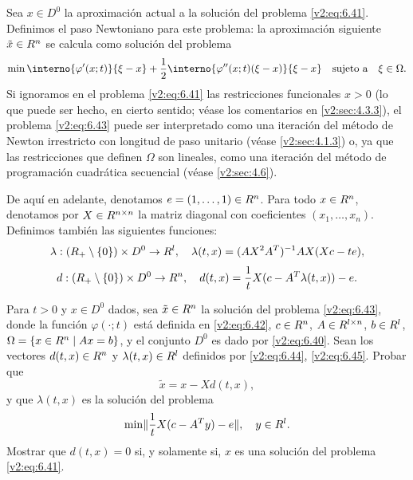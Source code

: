 Sea $x \in D^0$ la aproximación actual a la solución del problema \eqref{v2:eq:6.41}. Definimos el paso Newtoniano para este problema: la aproximación siguiente $\tilde{x} \in R^n$ se calcula como solución del problema
\begin{equation}
    \min \interno{\varphi'(x; t)}{\xi - x} + \frac{1}{2}\interno{\varphi''(x; t)(\xi - x)}{\xi - x} \quad \text{sujeto a} \quad \xi \in \Omega.
    \label{v2:eq:6.43}
\end{equation}
Si ignoramos en el problema \eqref{v2:eq:6.41} las restricciones funcionales $x > 0$ (lo que puede ser hecho, en cierto sentido; véase los comentarios en \cref{v2:sec:4.3.3}), el problema \eqref{v2:eq:6.43} puede ser interpretado como una iteración del método de Newton irrestricto con longitud de paso unitario (véase \cref{v2:sec:4.1.3}) o, ya que las restricciones que definen $\Omega$ son lineales, como una iteración del método de programación cuadrática secuencial (véase \cref{v2:sec:4.6}).

De aquí en adelante, denotamos $e = (1, \dots, 1) \in R^n$. Para todo $x \in R^n$, denotamos por $X \in R^{n \times n}$ la matriz diagonal con coeficientes $(x_1, \dots, x_n)$. Definimos también las siguientes funciones:
\begin{equation}
    \lambda : (R_+ \setminus \{0\}) \times D^0 \to R^l, \quad \lambda(t, x) = (A X^2 A^T)^{-1} A X (X c - te),
    \label{v2:eq:6.44}
\end{equation}
\begin{equation}
    d : (R_+ \setminus \{0\}) \times D^0 \to R^n, \quad d(t, x) = \frac{1}{t} X (c - A^T \lambda(t, x)) - e.
    \label{v2:eq:6.45}
\end{equation}

\begin{exercise}\label{v2:ejer:6.1.19}
    Para $t > 0$ y $x \in D^0$ dados, sea $\tilde{x} \in R^n$ la solución del problema \eqref{v2:eq:6.43}, donde la función $\varphi(\cdot; t)$ está definida en \eqref{v2:eq:6.42}, $c \in R^n$, $A \in R^{l \times n}$, $b \in R^l$, $\Omega = \{ x \in R^n \mid Ax = b \}$, y el conjunto $D^0$ es dado por \eqref{v2:eq:6.40}. Sean los vectores $d(t, x) \in R^n$ y $\lambda(t, x) \in R^l$ definidos por \eqref{v2:eq:6.44}, \eqref{v2:eq:6.45}.
    Probar que
    \[
        \tilde{x} = x - X d(t, x),
    \]
    y que $\lambda(t, x)$ es la solución del problema
    \[
        \min \lVert\frac{1}{t} X (c - A^T y) - e\rVert, \quad y \in R^l.
    \]
    Mostrar que $d(t, x) = 0$ si, y solamente si, $x$ es una solución del problema \eqref{v2:eq:6.41}.
\end{exercise}

